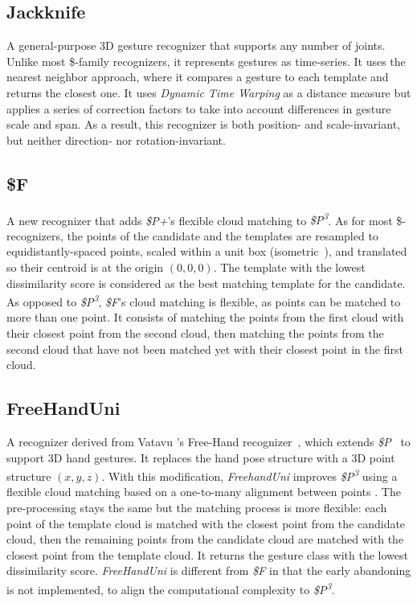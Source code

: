 \subsection{Jackknife}
A general-purpose 3D gesture recognizer \cite{Taranta:2017} that supports any number of joints. Unlike most \$-family recognizers, it represents gestures as time-series. It uses the nearest neighbor approach, where it compares a gesture to each template and returns the closest one. It uses \textit{Dynamic Time Warping} as a distance measure but applies a series of correction factors to take into account differences in gesture scale and span. As a result, this recognizer is both position- and scale-invariant, but neither direction- nor rotation-invariant.

\subsection{\$F}    
A new recognizer that adds \textit{\$P+}'s flexible cloud matching \cite{Vatavu:2017a} to \textit{\$P\textsuperscript{3}}. As for most \$-recognizers, the points of the candidate and the templates are resampled to equidistantly-spaced points, scaled within a unit box (isometric~\cite{Vanderdonckt:2018}), and translated so their centroid is at the origin $(0,0,0)$. The template with the lowest dissimilarity score is considered as the best matching template for the candidate. As opposed to \textit{\$P\textsuperscript{3}}, \textit{\$F}'s cloud matching is flexible, as points can be matched to more than one point. It consists of matching the points from the first cloud with their closest point from the second cloud, then matching the points from the second cloud that have not been matched yet with their closest point in the first cloud. 
    
\subsection{FreeHandUni}
A recognizer derived from Vatavu \etal's Free-Hand recognizer~\cite{Vatavu:2016}, which extends \textit{\$P}~\cite{Vatavu:2012} to support 3D hand gestures. It replaces the hand pose structure with a 3D point structure $(x,y,z)$. With this modification, \textit{FreehandUni} improves \textit{\$P\textsuperscript{3}} using a flexible cloud matching based on a one-to-many alignment between points \cite{Vatavu:2017a}. The pre-processing stays the same but the matching process is more flexible: each point of the template cloud is matched with the closest point from the candidate cloud, then the remaining points from the candidate cloud are matched with the closest point from the template cloud. It returns the gesture class with the lowest dissimilarity score. \textit{FreeHandUni} is different from \textit{\$F} in that the early abandoning is not implemented, to align the computational complexity to \textit{\$P\textsuperscript{3}}.
    
